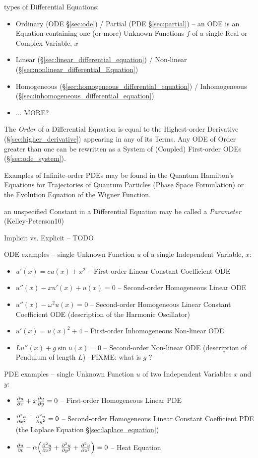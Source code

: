types of Differential Equations:
\begin{itemize}
  \item Ordinary (ODE \S\ref{sec:ode}) / Partial (PDE \S\ref{sec:partial}) --
    an ODE is an Equation containing one (or more) Unknown Functions $f$ of a
    single Real or Complex Variable, $x$
  \item Linear (\S\ref{sec:linear_differential_equation}) /
    Non-linear (\S\ref{sec:nonlinear_differential_Equation})
  \item Homogeneous (\S\ref{sec:homogeneous_differential_equation}) /
    Inhomogeneous (\S\ref{sec:inhomogeneous_differential_equation})
  \item ... MORE?
\end{itemize}

The \emph{Order} of a Differential Equation is equal to the Highest-order
Derivative (\S\ref{sec:higher_derivative}) appearing in any of its Terms. Any
ODE of Order greater than one can be rewritten as a System of (Coupled)
First-order ODEs (\S\ref{sec:ode_system}).

Examples of Infinite-order PDEs may be found in the Quantum Hamilton's Equations
for Trajectories of Quantum Particles (Phase Space Formulation) or the Evolution
Equation of the Wigner Function.

an unspecified Constant in a Differential Equation may be called a
\emph{Parameter} (Kelley-Peterson10)

Implicit vs. Explicit -- TODO

ODE examples -- single Unknown Function $u$ of a single Independent Variable,
$x$:
\begin{itemize}
\item $u'(x) = cu(x) + x^2$ -- First-order Linear Constant Coefficient ODE
\item $u''(x) - xu'(x) + u(x) = 0$ -- Second-order Homogeneous Linear ODE
\item $u''(x) - \omega^2u(x) = 0$ -- Second-order Homogeneous Linear Constant
  Coefficient ODE (description of the Harmonic Oscillator)
\item $u'(x) = u(x)^2 + 4$ -- First-order Inhomogeneous Non-linear ODE
\item $Lu''(x) + g\sin{u(x)} = 0$ -- Second-order Non-linear ODE (description of
  Pendulum of length $L$) --FIXME: what is $g$ ?
\end{itemize}

PDE examples -- single Unknown Function $u$ of two Independent Variables $x$ and
$y$:
\begin{itemize}
\item $\frac{\partial{u}}{\partial{x}} + x\frac{\partial{u}}{\partial{y}} = 0$ -- First-order Homogeneous Linear PDE
\item $\frac{\partial{^2u}}{\partial{x^2}} + \frac{\partial{^2u}}{\partial{y^2}} = 0$ -- Second-order Homogeneous
  Linear Constant Coefficient PDE (the Laplace Equation
  \S\ref{sec:laplace_equation})
\item $\frac{\partial{u}}{\partial{t}} - \alpha\Big(
      \frac{\partial{^2u}}{\partial{x^2}} + \frac{\partial{^2u}}{\partial{y^2}} + \frac{\partial{^2u}}{\partial{z^2}}
    \Big) = 0$ -- Heat Equation
\end{itemize}

